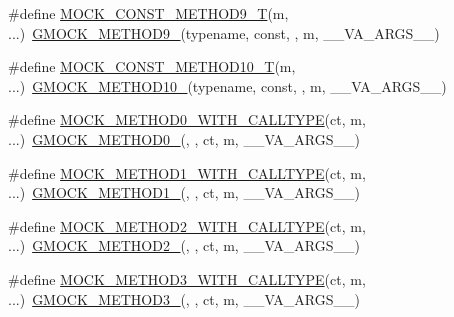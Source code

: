 \begin{DoxyCompactItemize}
\item 
\#define \mbox{\hyperlink{gmock-generated-function-mockers_8h_a7875d0d77516825a4b9cee703ae85c6f}{M\+O\+C\+K\+\_\+\+C\+O\+N\+S\+T\+\_\+\+M\+E\+T\+H\+O\+D9\+\_\+T}}(m, ...)~\mbox{\hyperlink{gmock-generated-function-mockers_8h_aa820171a19cc587c247dbe05cbffc55f}{G\+M\+O\+C\+K\+\_\+\+M\+E\+T\+H\+O\+D9\+\_\+}}(typename, const, , m, \+\_\+\+\_\+\+V\+A\+\_\+\+A\+R\+G\+S\+\_\+\+\_\+)
\item 
\#define \mbox{\hyperlink{gmock-generated-function-mockers_8h_aa31d758cb898bad2d16ac706c204da7f}{M\+O\+C\+K\+\_\+\+C\+O\+N\+S\+T\+\_\+\+M\+E\+T\+H\+O\+D10\+\_\+T}}(m, ...)~\mbox{\hyperlink{gmock-generated-function-mockers_8h_a81a48223a8771de36ef92ac6d56f6e81}{G\+M\+O\+C\+K\+\_\+\+M\+E\+T\+H\+O\+D10\+\_\+}}(typename, const, , m, \+\_\+\+\_\+\+V\+A\+\_\+\+A\+R\+G\+S\+\_\+\+\_\+)
\item 
\#define \mbox{\hyperlink{gmock-generated-function-mockers_8h_acedf2c97e3493f4f39d35bbead8d9e4a}{M\+O\+C\+K\+\_\+\+M\+E\+T\+H\+O\+D0\+\_\+\+W\+I\+T\+H\+\_\+\+C\+A\+L\+L\+T\+Y\+PE}}(ct,  m, ...)~\mbox{\hyperlink{gmock-generated-function-mockers_8h_ae0d290ffa58d7c624b2e3487ba1252f4}{G\+M\+O\+C\+K\+\_\+\+M\+E\+T\+H\+O\+D0\+\_\+}}(, , ct, m, \+\_\+\+\_\+\+V\+A\+\_\+\+A\+R\+G\+S\+\_\+\+\_\+)
\item 
\#define \mbox{\hyperlink{gmock-generated-function-mockers_8h_a3ffee4ba10588254eb44e67603e9de71}{M\+O\+C\+K\+\_\+\+M\+E\+T\+H\+O\+D1\+\_\+\+W\+I\+T\+H\+\_\+\+C\+A\+L\+L\+T\+Y\+PE}}(ct,  m, ...)~\mbox{\hyperlink{gmock-generated-function-mockers_8h_a1bc0012d62440dda77208dabdf4925c9}{G\+M\+O\+C\+K\+\_\+\+M\+E\+T\+H\+O\+D1\+\_\+}}(, , ct, m, \+\_\+\+\_\+\+V\+A\+\_\+\+A\+R\+G\+S\+\_\+\+\_\+)
\item 
\#define \mbox{\hyperlink{gmock-generated-function-mockers_8h_a27fcf1de830388291c2a81b144b8f89b}{M\+O\+C\+K\+\_\+\+M\+E\+T\+H\+O\+D2\+\_\+\+W\+I\+T\+H\+\_\+\+C\+A\+L\+L\+T\+Y\+PE}}(ct,  m, ...)~\mbox{\hyperlink{gmock-generated-function-mockers_8h_a885295ca6bebb15efb3fc786218c5d47}{G\+M\+O\+C\+K\+\_\+\+M\+E\+T\+H\+O\+D2\+\_\+}}(, , ct, m, \+\_\+\+\_\+\+V\+A\+\_\+\+A\+R\+G\+S\+\_\+\+\_\+)
\item 
\#define \mbox{\hyperlink{gmock-generated-function-mockers_8h_afef2985a236f7588139c690d395758fb}{M\+O\+C\+K\+\_\+\+M\+E\+T\+H\+O\+D3\+\_\+\+W\+I\+T\+H\+\_\+\+C\+A\+L\+L\+T\+Y\+PE}}(ct,  m, ...)~\mbox{\hyperlink{gmock-generated-function-mockers_8h_af7c77ba511c631de02bb8c45a6ed3045}{G\+M\+O\+C\+K\+\_\+\+M\+E\+T\+H\+O\+D3\+\_\+}}(, , ct, m, \+\_\+\+\_\+\+V\+A\+\_\+\+A\+R\+G\+S\+\_\+\+\_\+)

\end{DoxyCompactItemize}

